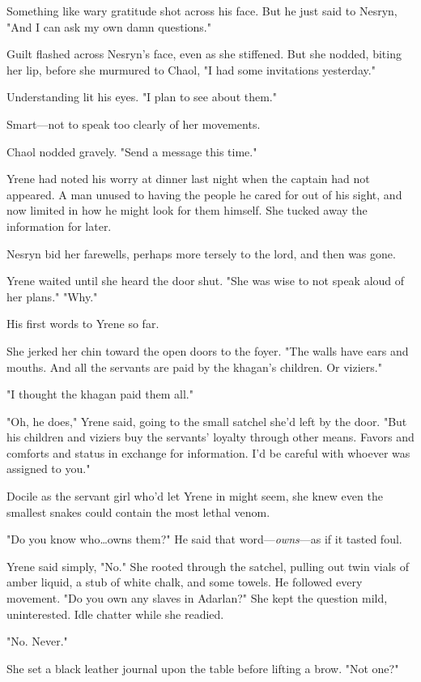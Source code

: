 Something like wary gratitude shot across his face.
But he just said to Nesryn, "And I can ask my own damn questions."

Guilt flashed across Nesryn's face, even as she stiffened.
But she nodded, biting her lip, before she murmured to Chaol, "I had some invitations yesterday."

Understanding lit his eyes.
"I plan to see about them."

Smart---not to speak too clearly of her movements.

Chaol nodded gravely.
"Send a message this time."

Yrene had noted his worry at dinner last night when the captain had not appeared.
A man unused to having the people he cared for out of his sight, and now limited in how he might look for them himself.
She tucked away the information for later.

Nesryn bid her farewells, perhaps more tersely to the lord, and then was gone.

Yrene waited until she heard the door shut.
"She was wise to not speak aloud of her plans."
"Why."

His first words to Yrene so far.

She jerked her chin toward the open doors to the foyer.
"The walls have ears and mouths.
And all the servants are paid by the khagan's children.
Or viziers."

"I thought the khagan paid them all."

"Oh, he does," Yrene said, going to the small satchel she'd left by the door.
"But his children and viziers buy the servants' loyalty through other means.
Favors and comforts and status in exchange for information.
I'd be careful with whoever was assigned to you."

Docile as the servant girl who'd let Yrene in might seem, she knew even the smallest snakes could contain the most lethal venom.

"Do you know who\ldots owns them?"
He said that word---\emph{owns}---as if it tasted foul.

Yrene said simply, "No."
She rooted through the satchel, pulling out twin vials of amber liquid, a stub of white chalk, and some towels.
He followed every movement.
"Do you own any slaves in Adarlan?"
She kept the question mild, uninterested.
Idle chatter while she readied.

"No.
Never."

She set a black leather journal upon the table before lifting a brow.
"Not one?"

